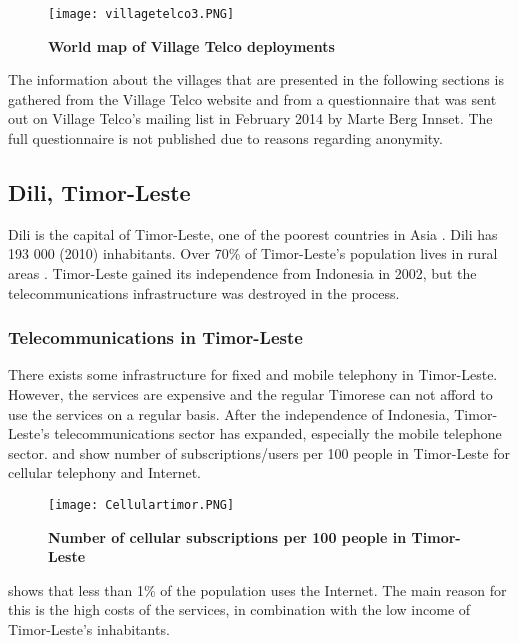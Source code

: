 \begin{figure}[H]
\centering
\texttt{[image: villagetelco3.PNG]}
\caption [World map of Village Telco deployments]{\textbf{World map of Village Telco deployments}}
\label{fig:mapdeployments}
\end{figure}

The information about the villages that are presented in the following sections is gathered from the Village Telco website \cite{villagetelcodeployments} and from a questionnaire that was sent out on Village Telco's mailing list in February 2014 by Marte Berg Innset. The full questionnaire is not published due to reasons regarding anonymity. 

\subsection{Dili, Timor-Leste}\label{sec:timor}
Dili is the capital of Timor-Leste, one of the poorest countries in Asia \cite{vtdili}. Dili has 193 000 (2010) inhabitants. Over 70\% of Timor-Leste's population lives in rural areas \cite{quandltimor}.  Timor-Leste gained its independence from Indonesia in 2002, but the telecommunications infrastructure was destroyed in the process. 


\subsubsection{Telecommunications in Timor-Leste}
There exists some infrastructure for fixed and mobile telephony in Timor-Leste. However, the services are expensive and the regular Timorese can not afford to use the services on a regular basis. After the independence of Indonesia, Timor-Leste's telecommunications sector has expanded, especially the mobile telephone sector.  and  show number of subscriptions/users per 100 people in Timor-Leste for cellular telephony and Internet. 

\begin{figure}[H]
\centering
\texttt{[image: Cellulartimor.PNG]}
\caption[Number of cellular subscriptions per 100 people in Timor-Leste]{\textbf{Number of cellular subscriptions per 100 people in Timor-Leste}}
\label{fig:cellulartimor}
\end{figure}

 shows that less than 1\% of the population uses the Internet. The main reason for this is the high costs of the services, in combination with the low income of Timor-Leste's inhabitants. 


